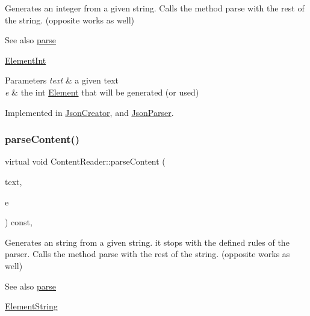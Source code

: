 Generates an integer from a given string. Calls the method parse with the rest of the string. (opposite works as well) \begin{DoxySeeAlso}{See also}
\mbox{\hyperlink{classContentReader_a7fff2e63a2e8fa216665604f69974e1d}{parse}} 

\mbox{\hyperlink{classElementInt}{Element\+Int}}
\end{DoxySeeAlso}

\begin{DoxyParams}{Parameters}
{\em text} & a given text \\
\hline
{\em e} & the int \mbox{\hyperlink{classElement}{Element}} that will be generated (or used) \\
\hline
\end{DoxyParams}


Implemented in \mbox{\hyperlink{classJsonCreator_a0fe34794ee3563c3e0bc35006129fcdc}{Json\+Creator}}, and \mbox{\hyperlink{classJsonParser_ac80cf84ff2565f4c1f3a0f5ddb559c96}{Json\+Parser}}.

\mbox{\label{classContentReader_a310678ddc37a05aca2f13db73b22abe5}} 
\subsubsection{\texorpdfstring{parse\+Content()}{parseContent()}\hspace{0.1cm}{\footnotesize\ttfamily [2/6]}}
{\footnotesize\ttfamily virtual void Content\+Reader\+::parse\+Content (\begin{DoxyParamCaption}\item[{std\+::string \&}]{text,  }\item[{\mbox{\hyperlink{classElementString}{Element\+String}} $\ast$}]{e }\end{DoxyParamCaption}) const\hspace{0.3cm}{\ttfamily [pure virtual]}, {\ttfamily [inherited]}}

Generates an string from a given string. it stops with the defined rules of the parser. Calls the method parse with the rest of the string. (opposite works as well) \begin{DoxySeeAlso}{See also}
\mbox{\hyperlink{classContentReader_a7fff2e63a2e8fa216665604f69974e1d}{parse}} 

\mbox{\hyperlink{classElementString}{Element\+String}}
\end{DoxySeeAlso}

